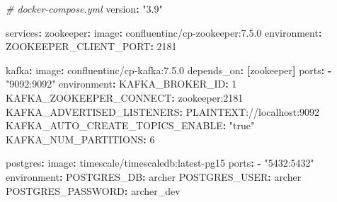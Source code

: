 \documentclass[
]{article}
\newenvironment{Shaded}{}{}
\newcommand{\AttributeTok}[1]{\textcolor[rgb]{0.49,0.56,0.16}{#1}}
\newcommand{\CommentTok}[1]{\textcolor[rgb]{0.38,0.63,0.69}{\textit{#1}}}
\newcommand{\DecValTok}[1]{\textcolor[rgb]{0.25,0.63,0.44}{#1}}
\newcommand{\FunctionTok}[1]{\textcolor[rgb]{0.02,0.16,0.49}{#1}}
\newcommand{\KeywordTok}[1]{\textcolor[rgb]{0.00,0.44,0.13}{\textbf{#1}}}
\newcommand{\StringTok}[1]{\textcolor[rgb]{0.25,0.44,0.63}{#1}}
\begin{document}
\begin{Shaded}
\begin{Highlighting}[]
\CommentTok{\# docker{-}compose.yml}
\FunctionTok{version}\KeywordTok{:}\AttributeTok{ }\StringTok{"3.9"}

\FunctionTok{services}\KeywordTok{:}
\AttributeTok{  }\FunctionTok{zookeeper}\KeywordTok{:}
\AttributeTok{    }\FunctionTok{image}\KeywordTok{:}\AttributeTok{ confluentinc/cp{-}zookeeper:7.5.0}
\AttributeTok{    }\FunctionTok{environment}\KeywordTok{:}
\AttributeTok{      }\FunctionTok{ZOOKEEPER\_CLIENT\_PORT}\KeywordTok{:}\AttributeTok{ }\DecValTok{2181}

\AttributeTok{  }\FunctionTok{kafka}\KeywordTok{:}
\AttributeTok{    }\FunctionTok{image}\KeywordTok{:}\AttributeTok{ confluentinc/cp{-}kafka:7.5.0}
\AttributeTok{    }\FunctionTok{depends\_on}\KeywordTok{:}\AttributeTok{ }\KeywordTok{[}\AttributeTok{zookeeper}\KeywordTok{]}
\AttributeTok{    }\FunctionTok{ports}\KeywordTok{:}
\AttributeTok{      }\KeywordTok{{-}}\AttributeTok{ }\StringTok{"9092:9092"}
\AttributeTok{    }\FunctionTok{environment}\KeywordTok{:}
\AttributeTok{      }\FunctionTok{KAFKA\_BROKER\_ID}\KeywordTok{:}\AttributeTok{ }\DecValTok{1}
\AttributeTok{      }\FunctionTok{KAFKA\_ZOOKEEPER\_CONNECT}\KeywordTok{:}\AttributeTok{ zookeeper:2181}
\AttributeTok{      }\FunctionTok{KAFKA\_ADVERTISED\_LISTENERS}\KeywordTok{:}\AttributeTok{ PLAINTEXT://localhost:9092}
\AttributeTok{      }\FunctionTok{KAFKA\_AUTO\_CREATE\_TOPICS\_ENABLE}\KeywordTok{:}\AttributeTok{ }\StringTok{"true"}
\AttributeTok{      }\FunctionTok{KAFKA\_NUM\_PARTITIONS}\KeywordTok{:}\AttributeTok{ }\DecValTok{6}

\AttributeTok{  }\FunctionTok{postgres}\KeywordTok{:}
\AttributeTok{    }\FunctionTok{image}\KeywordTok{:}\AttributeTok{ timescale/timescaledb:latest{-}pg15}
\AttributeTok{    }\FunctionTok{ports}\KeywordTok{:}
\AttributeTok{      }\KeywordTok{{-}}\AttributeTok{ }\StringTok{"5432:5432"}
\AttributeTok{    }\FunctionTok{environment}\KeywordTok{:}
\AttributeTok{      }\FunctionTok{POSTGRES\_DB}\KeywordTok{:}\AttributeTok{ archer}
\AttributeTok{      }\FunctionTok{POSTGRES\_USER}\KeywordTok{:}\AttributeTok{ archer}
\AttributeTok{      }\FunctionTok{POSTGRES\_PASSWORD}\KeywordTok{:}\AttributeTok{ archer\_dev}


\end{Highlighting}
\end{Shaded}
\end{document}
